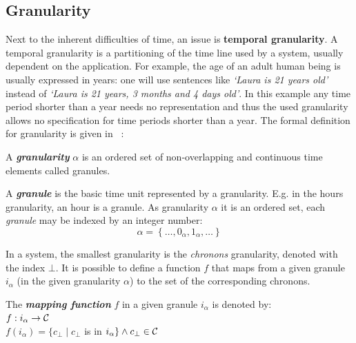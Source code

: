 \subsection{\label{subsec:granularity}Granularity}
Next to the inherent difficulties of time, an issue is \textbf{temporal granularity}. A temporal granularity is a partitioning of the time line used by a system, usually dependent on the application. For example, the age of an adult human being is usually expressed in years: one will use sentences like \emph{`Laura is 21 years old'} instead of \emph{`Laura is 21 years, 3 months and 4 days old'}. In this example any time period shorter than a year needs no representation and thus the used granularity allows no specification for time periods shorter than a year.
The formal definition for granularity is given in ~\cite{Lin97}:


\begin{definition}
\label{def:granularity}
A \textbf{\emph{granularity}} $\alpha$ is an ordered set of non-overlapping and continuous time elements called granules. \\
\end{definition}

\begin{definition}
\label{def:granule}
A \textbf{\emph{granule}} is the basic time unit represented by a granularity. E.g. in the hours granularity, an hour is a granule.
As granularity $\alpha$ it is an ordered set, each \emph{granule} may be indexed by an integer number:\\
\begin{equation}
\alpha = \left \lbrace \ldots, 0_\alpha, 1_\alpha, \ldots \right \rbrace
\end{equation}
\end{definition}

In a system, the smallest granularity is the \emph{chronons} granularity, denoted with the index $\bot$. It is possible to define a function $f$ that maps from  a given granule $i_\alpha$ (in the given granularity $\alpha$) to the set of the corresponding chronons. 

\begin{definition}
\label{def:mapping-function}
The \textbf{\emph{mapping function}} $f$ in a given granule $i_\alpha$ is denoted by:\\
$f:i_\alpha \rightarrow \mathcal{C}$\\
$f(i_\alpha) = \lbrace c_\bot \mid c_\bot$ is in $i_\alpha \rbrace \wedge c_\bot \in \mathcal{C}$\\
\end{definition}


